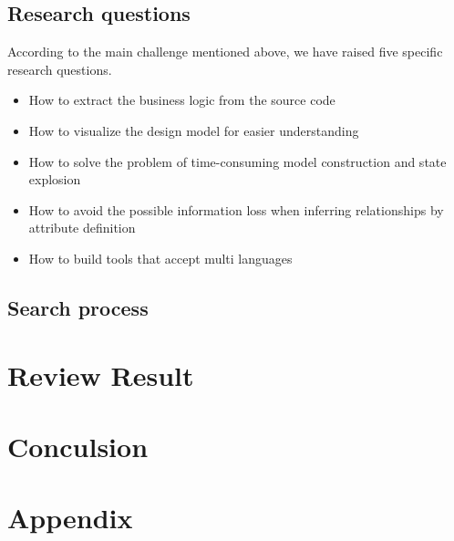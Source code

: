 \documentclass[acmsmall]{acmart}
\begin{document}
\subsection{Research questions}
According to the main challenge mentioned above, we have raised five specific research questions.
\begin{itemize}
\item  How to extract the business logic from the source code
\item  How to visualize the design model for easier understanding
\item  How to solve the problem of time-consuming model construction and state explosion
\item  How to avoid the possible information loss when inferring relationships by attribute definition
\item  How to build tools that accept multi languages
\end{itemize}

\subsection{Search process}


\section{Review Result}


\section{Conculsion}





\section{Appendix}
\end{document}
